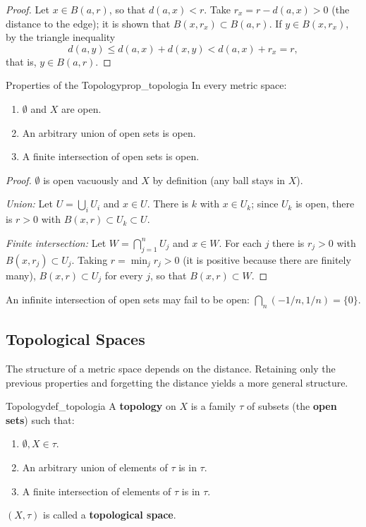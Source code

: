 \documentclass[11pt, a4paper]{article}
\begin{document}
\begin{proof}
Let $x \in B(a, r)$, so that $d(a, x) < r$. Take $r_x = r - d(a, x) > 0$ (the distance to the
edge); it is shown that $B(x, r_x) \subset B(a, r)$. If $y \in B(x, r_x)$, by the triangle inequality
$$ d(a, y) \le d(a, x) + d(x, y) < d(a,x) + r_x = r, $$
that is, $y \in B(a, r)$.
\end{proof}

\begin{proposicion}{Properties of the Topology}{prop_topologia}
In every metric space:
\begin{enumerate}
    \item $\emptyset$ and $X$ are open.
    \item An arbitrary union of open sets is open.
    \item A finite intersection of open sets is open.
\end{enumerate}
\end{proposicion}

\begin{proof}
$\emptyset$ is open vacuously and $X$ by definition (any ball stays in $X$).

\textit{Union:} Let $U = \bigcup_i U_i$ and $x \in U$. There is $k$ with $x \in U_k$; since $U_k$ is
open, there is $r > 0$ with $B(x, r) \subset U_k \subset U$.

\textit{Finite intersection:} Let $W = \bigcap_{j=1}^n U_j$ and $x \in W$. For each $j$ there is
$r_j > 0$ with $B(x, r_j) \subset U_j$. Taking $r = \min_j r_j > 0$ (it is positive because there are
finitely many), $B(x, r) \subset U_j$ for every $j$, so that $B(x, r) \subset W$.
\end{proof}

\obs An infinite intersection of open sets may fail to be open: $\bigcap_n (-1/n, 1/n) = \{0\}$.

\subsection{Topological Spaces}

The structure of a metric space depends on the distance. Retaining only the previous properties
and forgetting the distance yields a more general structure.

\begin{definicion}{Topology}{def_topologia}
A \textbf{topology} on $X$ is a family $\tau$ of subsets (the \textbf{open sets}) such that:
\begin{enumerate}
    \item $\emptyset, X \in \tau$.
    \item An arbitrary union of elements of $\tau$ is in $\tau$.
    \item A finite intersection of elements of $\tau$ is in $\tau$.
\end{enumerate}
$(X, \tau)$ is called a \textbf{topological space}.
\end{definicion}
\end{document}
